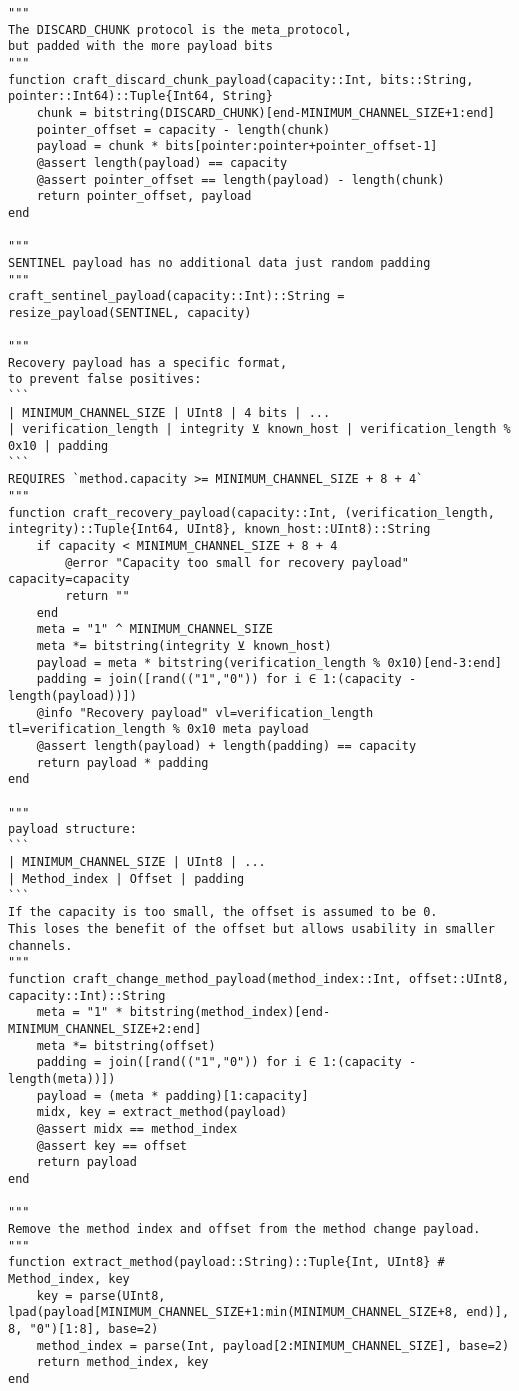 \begin{lstlisting}[language=JuliaLocal, style=julia]
"""
The DISCARD_CHUNK protocol is the meta_protocol,
but padded with the more payload bits
"""
function craft_discard_chunk_payload(capacity::Int, bits::String, pointer::Int64)::Tuple{Int64, String}
    chunk = bitstring(DISCARD_CHUNK)[end-MINIMUM_CHANNEL_SIZE+1:end]
    pointer_offset = capacity - length(chunk)
    payload = chunk * bits[pointer:pointer+pointer_offset-1]
    @assert length(payload) == capacity
    @assert pointer_offset == length(payload) - length(chunk)
    return pointer_offset, payload
end

"""
SENTINEL payload has no additional data just random padding
"""
craft_sentinel_payload(capacity::Int)::String = resize_payload(SENTINEL, capacity)

"""
Recovery payload has a specific format,
to prevent false positives:
```
| MINIMUM_CHANNEL_SIZE | UInt8 | 4 bits | ...
| verification_length | integrity ⊻ known_host | verification_length % 0x10 | padding
```
REQUIRES `method.capacity >= MINIMUM_CHANNEL_SIZE + 8 + 4`
"""
function craft_recovery_payload(capacity::Int, (verification_length, integrity)::Tuple{Int64, UInt8}, known_host::UInt8)::String
    if capacity < MINIMUM_CHANNEL_SIZE + 8 + 4
        @error "Capacity too small for recovery payload" capacity=capacity
        return ""
    end
    meta = "1" ^ MINIMUM_CHANNEL_SIZE
    meta *= bitstring(integrity ⊻ known_host)
    payload = meta * bitstring(verification_length % 0x10)[end-3:end]
    padding = join([rand(("1","0")) for i ∈ 1:(capacity - length(payload))])
    @info "Recovery payload" vl=verification_length tl=verification_length % 0x10 meta payload
    @assert length(payload) + length(padding) == capacity
    return payload * padding
end

"""
payload structure:
```
| MINIMUM_CHANNEL_SIZE | UInt8 | ...
| Method_index | Offset | padding
```
If the capacity is too small, the offset is assumed to be 0.
This loses the benefit of the offset but allows usability in smaller channels.
"""
function craft_change_method_payload(method_index::Int, offset::UInt8, capacity::Int)::String
    meta = "1" * bitstring(method_index)[end-MINIMUM_CHANNEL_SIZE+2:end]
    meta *= bitstring(offset)
    padding = join([rand(("1","0")) for i ∈ 1:(capacity - length(meta))])
    payload = (meta * padding)[1:capacity]
    midx, key = extract_method(payload)
    @assert midx == method_index
    @assert key == offset
    return payload
end

"""
Remove the method index and offset from the method change payload.
"""
function extract_method(payload::String)::Tuple{Int, UInt8} # Method_index, key
    key = parse(UInt8, lpad(payload[MINIMUM_CHANNEL_SIZE+1:min(MINIMUM_CHANNEL_SIZE+8, end)], 8, "0")[1:8], base=2)
    method_index = parse(Int, payload[2:MINIMUM_CHANNEL_SIZE], base=2)
    return method_index, key
end


\end{lstlisting}
